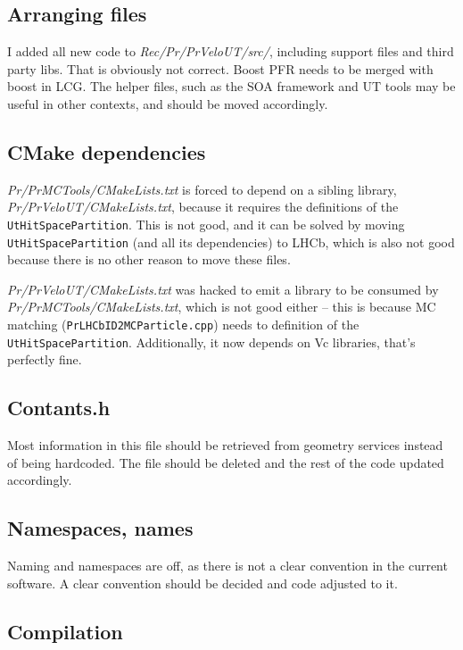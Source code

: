\documentclass[12pt]{article}
\newcommand{\code}[1]{\texttt{#1}}
\begin{document}
\subsection{Arranging files}

I added all new code to \textit{Rec/Pr/PrVeloUT/src/}, including support files and third party libs. That is obviously not correct. Boost PFR needs to be merged with boost in LCG. The helper files, such as the SOA framework and UT tools may be useful in other contexts, and should be moved accordingly.

\subsection{CMake dependencies}

\textit{Pr/PrMCTools/CMakeLists.txt} is forced to depend on a sibling library, \textit{Pr/PrVeloUT/CMakeLists.txt}, because it requires the definitions of the \code{UtHitSpacePartition}. This is not good, and it can be solved by moving \code{UtHitSpacePartition} (and all its dependencies) to LHCb, which is also not good because there is no other reason to move these files.

\textit{Pr/PrVeloUT/CMakeLists.txt} was hacked to emit a library to be consumed by \textit{Pr/PrMCTools/CMakeLists.txt}, which is not good either -- this is because MC matching (\code{PrLHCbID2MCParticle.cpp}) needs to definition of the \code{UtHitSpacePartition}. Additionally, it now depends on Vc libraries, that's perfectly fine. 


\subsection{Contants.h}

Most information in this file should be retrieved from geometry services instead of being hardcoded. The file should be deleted and the rest of the code updated accordingly.

\subsection{Namespaces, names}

Naming and namespaces are off, as there is not a clear convention in the current software. A clear convention should be decided and code adjusted to it.

\subsection{Compilation}
\end{document}
